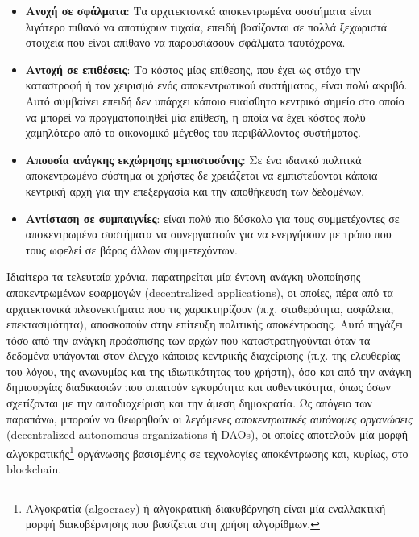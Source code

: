 \begin{itemize}
	\item \textbf{Ανοχή σε σφάλματα}: Τα αρχιτεκτονικά αποκεντρωμένα συστήματα είναι λιγότερο πιθανό να αποτύχουν τυχαία, επειδή βασίζονται σε πολλά ξεχωριστά στοιχεία που είναι απίθανο να παρουσιάσουν σφάλματα ταυτόχρονα.
	\item \textbf{Αντοχή σε επιθέσεις}: Το κόστος μίας επίθεσης, που έχει ως στόχο την καταστροφή ή τον χειρισμό ενός αποκεντρωτικού συστήματος, είναι πολύ ακριβό. Αυτό συμβαίνει επειδή δεν υπάρχει κάποιο ευαίσθητο κεντρικό σημείο στο οποίο να μπορεί να πραγματοποιηθεί μία επίθεση, η οποία να έχει κόστος πολύ χαμηλότερο από το οικονομικό μέγεθος του περιβάλλοντος συστήματος.
	\item \textbf{Απουσία ανάγκης εκχώρησης εμπιστοσύνης}: Σε ένα ιδανικό πολιτικά αποκεντρωμένο σύστημα οι χρήστες δε χρειάζεται να εμπιστεύονται κάποια κεντρική αρχή για την επεξεργασία και την αποθήκευση των δεδομένων. 
	\item \textbf{Αντίσταση σε συμπαιγνίες}: είναι πολύ πιο δύσκολο για τους συμμετέχοντες σε αποκεντρωμένα συστήματα να συνεργαστούν για να ενεργήσουν με τρόπο που τους ωφελεί σε βάρος άλλων συμμετεχόντων.
\end{itemize}

Ιδιαίτερα τα τελευταία χρόνια, παρατηρείται μία έντονη ανάγκη υλοποίησης αποκεντρωμένων εφαρμογών (decentralized applications), οι οποίες, πέρα από τα αρχιτεκτονικά πλεονεκτήματα που τις χαρακτηρίζουν (π.χ. σταθερότητα, ασφάλεια, επεκτασιμότητα), αποσκοπούν στην επίτευξη πολιτικής αποκέντρωσης. Αυτό πηγάζει τόσο από την ανάγκη προάσπισης των αρχών που καταστρατηγούνται όταν τα δεδομένα υπάγονται στον έλεγχο κάποιας κεντρικής διαχείρισης (π.χ. της ελευθερίας του λόγου, της ανωνυμίας και της ιδιωτικότητας του χρήστη), όσο και από την ανάγκη δημιουργίας διαδικασιών που απαιτούν εγκυρότητα και αυθεντικότητα, όπως όσων σχετίζονται με την αυτοδιαχείριση και την άμεση δημοκρατία. Ως απόγειο των παραπάνω, μπορούν να θεωρηθούν οι λεγόμενες \textit{αποκεντρωτικές αυτόνομες οργανώσεις} (decentralized autonomous organizations ή DAOs), οι οποίες αποτελούν μία μορφή αλγοκρατικής\footnote{Αλγοκρατία (algocracy) ή αλγοκρατική διακυβέρνηση είναι μία εναλλακτική μορφή διακυβέρνησης που βασίζεται στη χρήση αλγορίθμων.\cite{1.2-virtual-migration}} οργάνωσης βασισμένης σε τεχνολογίες αποκέντρωσης και, κυρίως, στο blockchain.
